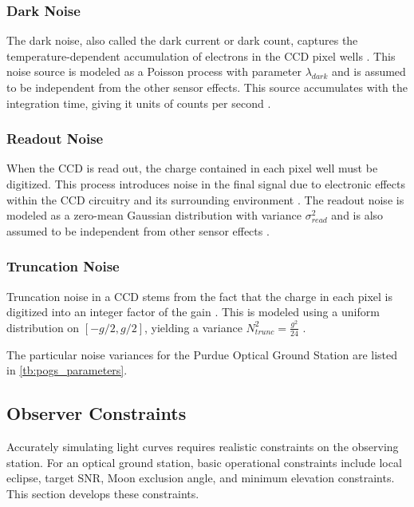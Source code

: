 \subsubsection{Dark Noise}

The dark noise, also called the dark current or dark count, captures the temperature-dependent accumulation of electrons in the CCD pixel wells \cite{krag2003}. This noise source is modeled as a Poisson process with parameter $\lambda_{dark}$ \cite{frueh2019notes} and is assumed to be independent from the other sensor effects. This source accumulates with the integration time, giving it units of counts per second \cite{krag2003}.

\subsubsection{Readout Noise}

When the CCD is read out, the charge contained in each pixel well must be digitized. This process introduces noise in the final signal due to electronic effects within the CCD circuitry and its surrounding environment \cite{krag2003}. The readout noise is modeled as a zero-mean Gaussian distribution with variance $\sigma_{read}^2$ and is also assumed to be independent from other sensor effects \cite{frueh2019notes}.

\subsubsection{Truncation Noise}

Truncation noise in a CCD stems from the fact that the charge in each pixel is digitized into an integer factor of the gain \cite{frueh2019notes}. This is modeled using a uniform distribution on $\left[ -g/2, g/2 \right]$, yielding a variance $N^2_{trunc} = \frac{g^2}{24}$ \cite{frueh2019notes}.

The particular noise variances for the Purdue Optical Ground Station are listed in \ref{tb:pogs_parameters}.


\subsection{Observer Constraints}

Accurately simulating light curves requires realistic constraints on the observing station. For an optical ground station, basic operational constraints include local eclipse, target SNR, Moon exclusion angle, and minimum elevation constraints. This section develops these constraints.

